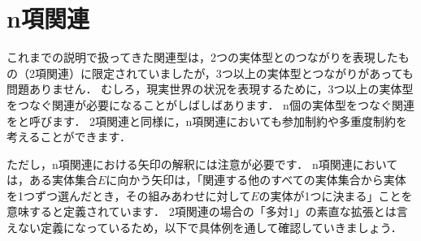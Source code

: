 
\section{n項関連}
これまでの説明で扱ってきた関連型は，2つの実体型とのつながりを表現したもの（2項関連）に限定されていましたが，3つ以上の実体型とつながりがあっても問題ありません．
むしろ，現実世界の状況を表現するために，3つ以上の実体型をつなぐ関連が必要になることがしばしばあります．
n個の実体型をつなぐ関連をと呼びます．
2項関連と同様に，n項関連においても参加制約や多重度制約を考えることができます．

ただし，n項関連における矢印の解釈には注意が必要です．
n項関連においては，ある実体集合$E$に向かう矢印は，「関連する他のすべての実体集合から実体を1つずつ選んだとき，その組みあわせに対して$E$の実体が1つに決まる」ことを意味すると定義されています．
2項関連の場合の「多対1」の素直な拡張とは言えない定義になっているため，以下で具体例を通して確認していきましょう．

